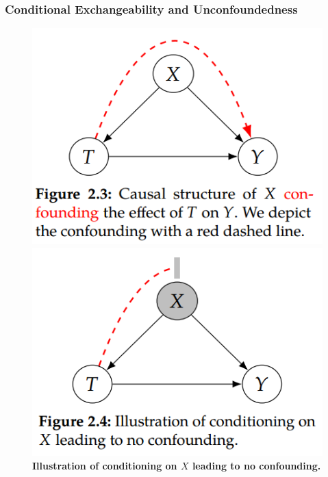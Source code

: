 \documentclass[11pt]{article}
\begin{document}
\subsubsection{Conditional Exchangeability and Unconfoundedness}
\begin{figure}
\begin{minipage}[t]{0.5\linewidth}
  \centering
  \centerline{\includegraphics[scale = 0.4]{cond_exch_1.png}}
\end{minipage}
\begin{minipage}[t]{0.5\linewidth}
  \centering
  \centerline{\includegraphics[scale = 0.4]{cond_exch_2.png}}
\end{minipage}
\caption{\footnotesize{\textbf{Illustration of conditioning on $X$ leading to no confounding. \citep{neal2020introduction}}}}
\label{fig: cond_exch}
\end{figure}
\end{document}
